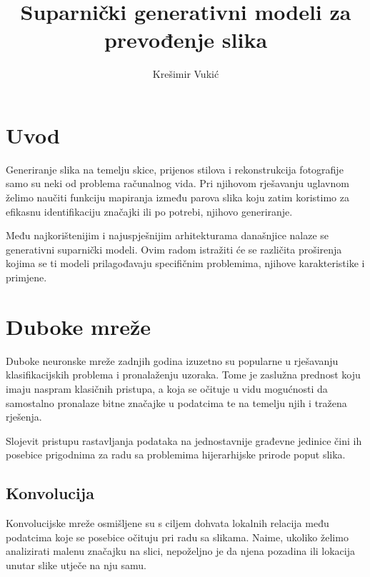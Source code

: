 \documentclass[lmodern, utf8, seminar]{fer}
\begin{document}
\nocite{*}



\title{Suparnički generativni modeli za prevođenje slika}

\author{Krešimir Vukić}

\maketitle


\tableofcontents



\chapter{Uvod}
Generiranje slika na temelju skice, prijenos stilova i rekonstrukcija fotografije samo su neki od problema računalnog vida. Pri njihovom rješavanju uglavnom želimo naučiti funkciju mapiranja između parova slika koju zatim koristimo za efikasnu identifikaciju značajki ili po potrebi, njihovo generiranje. 

Među najkorištenijim i najuspješnijim arhitekturama današnjice nalaze se generativni suparnički modeli. Ovim radom istražiti će se različita proširenja kojima se ti modeli prilagođavaju specifičnim problemima, njihove karakteristike i primjene.

\chapter{Duboke mreže}
Duboke neuronske mreže zadnjih godina izuzetno su popularne u rješavanju klasifikacijskih problema i pronalaženju uzoraka. Tome je zaslužna prednost koju imaju naspram klasičnih pristupa, a koja se očituje u vidu mogućnosti da samostalno pronalaze bitne značajke u podatcima te na temelju njih i tražena rješenja.

Slojevit pristupu rastavljanja podataka na jednostavnije građevne jedinice čini ih posebice prigodnima za radu sa problemima hijerarhijske prirode poput slika. 
\newline

\section{Konvolucija}
Konvolucijske mreže osmišljene su s ciljem dohvata lokalnih relacija među podatcima koje se posebice očituju pri radu sa slikama. Naime, ukoliko želimo analizirati malenu značajku na slici, nepoželjno je da njena pozadina ili lokacija unutar slike utječe na nju samu. 
\end{document}
